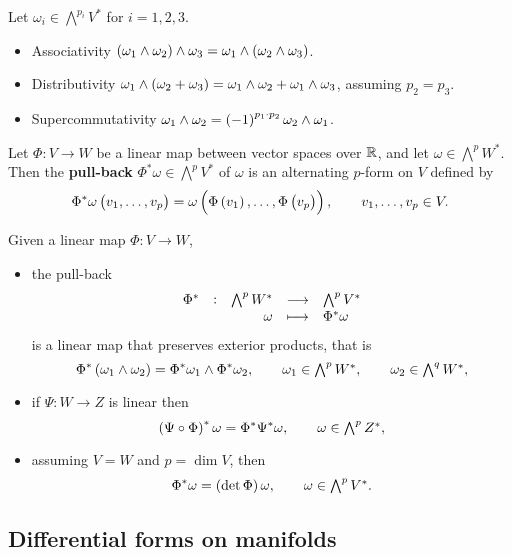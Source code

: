 \begin{proposition}
\label{prop:1.6}
Let $ \omega_i \in \bigwedge^{p_i}V^* $ for $ i = 1, 2, 3 $.
\begin{itemize}
\item Associativity $ \br{\omega_1 \wedge \omega_2} \wedge \omega_3 = \omega_1 \wedge \br{\omega_2 \wedge \omega_3} $.
\item Distributivity $ \omega_1 \wedge \br{\omega_2 + \omega_3} = \omega_1 \wedge \omega_2 + \omega_1 \wedge \omega_3 $, assuming $ p_2 = p_3 $.
\item Supercommutativity $ \omega_1 \wedge \omega_2 = \br{-1}^{p_1 \cdot p_2}\omega_2 \wedge \omega_1 $.
\end{itemize}
\end{proposition}

\begin{definition}
Let $ \Phi : V \to W $ be a linear map between vector spaces over $ \mathbb{R} $, and let $ \omega \in \bigwedge^pW^* $. Then the \textbf{pull-back} $ \Phi^*\omega \in \bigwedge^pV^* $ of $ \omega $ is an alternating $ p $-form on $ V $ defined by
$$ \Phi^*\omega\br{v_1, \dots, v_p} = \omega\br{\Phi\br{v_1}, \dots, \Phi\br{v_p}}, \qquad v_1, \dots, v_p \in V. $$
\end{definition}

\pagebreak

\begin{proposition}
\label{prop:1.8}
Given a linear map $ \Phi : V \to W $,
\begin{itemize}
\item the pull-back
$$ \function[\Phi^*]{\bigwedge^pW^*}{\bigwedge^pV^*}{\omega}{\Phi^*\omega} $$
is a linear map that preserves exterior products, that is
$$ \Phi^*\br{\omega_1 \wedge \omega_2} = \Phi^*\omega_1 \wedge \Phi^*\omega_2, \qquad \omega_1 \in \textstyle\bigwedge^pW^*, \qquad \omega_2 \in \textstyle\bigwedge^qW^*, $$
\item if $ \Psi : W \to Z $ is linear then
$$ \br{\Psi \circ \Phi}^*\omega = \Phi^*\Psi^*\omega, \qquad \omega \in \textstyle\bigwedge^pZ^*, $$
\item assuming $ V = W $ and $ p = \dim V $, then
$$ \Phi^*\omega = \br{\det \Phi}\omega, \qquad \omega \in \textstyle\bigwedge^pV^*. $$
\end{itemize}
\end{proposition}

\subsection{Differential forms on manifolds}

